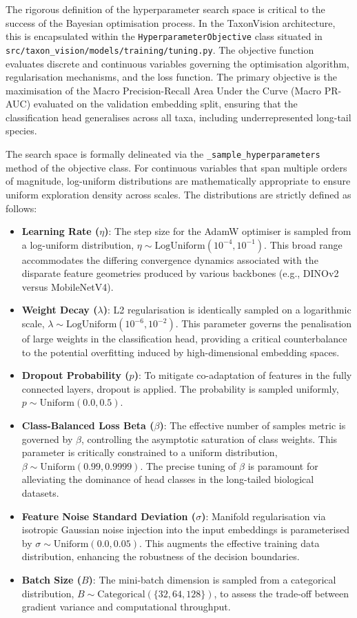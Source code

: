 The rigorous definition of the hyperparameter search space is critical to the success of the Bayesian optimisation process. In the TaxonVision architecture, this is encapsulated within the \texttt{HyperparameterObjective} class situated in \texttt{src/taxon\_vision/models/training/tuning.py}. The objective function evaluates discrete and continuous variables governing the optimisation algorithm, regularisation mechanisms, and the loss function. The primary objective is the maximisation of the Macro Precision-Recall Area Under the Curve (Macro PR-AUC) evaluated on the validation embedding split, ensuring that the classification head generalises across all taxa, including underrepresented long-tail species.

The search space is formally delineated via the \texttt{\_sample\_hyperparameters} method of the objective class. For continuous variables that span multiple orders of magnitude, log-uniform distributions are mathematically appropriate to ensure uniform exploration density across scales. The distributions are strictly defined as follows:
\begin{itemize}
    \item \textbf{Learning Rate ($\eta$)}: The step size for the AdamW optimiser is sampled from a log-uniform distribution, $\eta \sim \text{LogUniform}(10^{-4}, 10^{-1})$. This broad range accommodates the differing convergence dynamics associated with the disparate feature geometries produced by various backbones (e.g., DINOv2 versus MobileNetV4).
    \item \textbf{Weight Decay ($\lambda$)}: L2 regularisation is identically sampled on a logarithmic scale, $\lambda \sim \text{LogUniform}(10^{-6}, 10^{-2})$. This parameter governs the penalisation of large weights in the classification head, providing a critical counterbalance to the potential overfitting induced by high-dimensional embedding spaces.
    \item \textbf{Dropout Probability ($p$)}: To mitigate co-adaptation of features in the fully connected layers, dropout is applied. The probability is sampled uniformly, $p \sim \text{Uniform}(0.0, 0.5)$.
    \item \textbf{Class-Balanced Loss Beta ($\beta$)}: The effective number of samples metric is governed by $\beta$, controlling the asymptotic saturation of class weights. This parameter is critically constrained to a uniform distribution, $\beta \sim \text{Uniform}(0.99, 0.9999)$. The precise tuning of $\beta$ is paramount for alleviating the dominance of head classes in the long-tailed biological datasets.
    \item \textbf{Feature Noise Standard Deviation ($\sigma$)}: Manifold regularisation via isotropic Gaussian noise injection into the input embeddings is parameterised by $\sigma \sim \text{Uniform}(0.0, 0.05)$. This augments the effective training data distribution, enhancing the robustness of the decision boundaries.
    \item \textbf{Batch Size ($B$)}: The mini-batch dimension is sampled from a categorical distribution, $B \sim \text{Categorical}(\{32, 64, 128\})$, to assess the trade-off between gradient variance and computational throughput.
\end{itemize}

